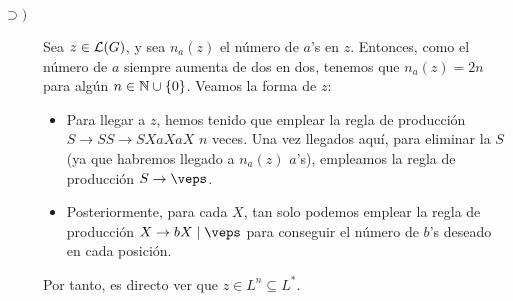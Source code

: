 \begin{ejercicio}
\begin{enumerate}
\begin{description}
            \item[$\supset)$] Sea $z\in\mathcal{L}(G)$, y sea $n_a(z)$ el número de $a$'s en $z$. Entonces, como el número de $a$ siempre aumenta de dos en dos, tenemos que $n_a(z)=2n$ para algún $n\in \mathbb{N}\cup \{0\}$.
            Veamos la forma de $z$:
            \begin{itemize}
                \item Para llegar a $z$, hemos tenido que emplear la regla de producción $S \rightarrow SS\rightarrow SXaXaX$ $n$ veces. Una vez llegados aquí, para eliminar la $S$ (ya que habremos llegado a $n_a(z)$ $a$'s), empleamos la regla de producción $S\rightarrow \veps$.
                \item Posteriormente, para cada $X$, tan solo podemos emplear la regla de producción $X\rightarrow bX \mid \veps$ para conseguir el número de $b$'s deseado en cada posición.
            \end{itemize}
            Por tanto, es directo ver que $z\in L^n\subseteq L^\ast$.
        \end{description}
    \end{enumerate}
\end{ejercicio}




